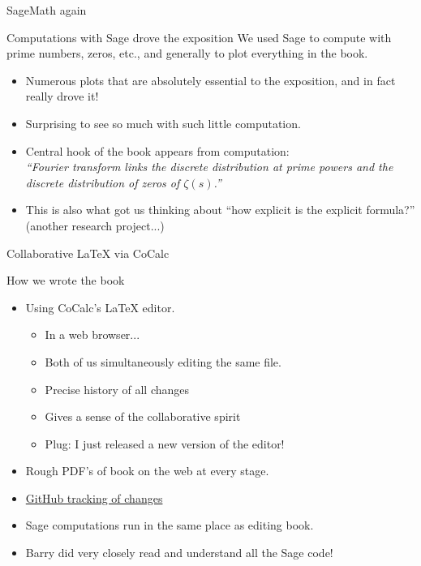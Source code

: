 \documentclass{beamer}
\begin{document}
\begin{frame}{SageMath again}
  \begin{block}{Computations with Sage drove the exposition}
    We used Sage to compute with prime numbers, zeros, etc., and generally to plot everything in the book.
    \begin{itemize}
      \item Numerous plots that are absolutely essential to the exposition, and in fact really drove it!
      \item Surprising to see so much with such little computation.
      \item Central hook of the book appears from computation:\\
            {\em ``Fourier transform links the discrete distribution at prime powers and the discrete distribution of zeros of $\zeta(s)$.''}
      \item This is also what got us thinking about ``how explicit is the explicit formula?'' (another research project...)
    \end{itemize}
  \end{block}
\end{frame}


\begin{frame}{Collaborative \LaTeX{} via CoCalc}
  \begin{block}{How we wrote the book}
    \begin{itemize}
      \item Using CoCalc's \LaTeX{} editor.
            \begin{itemize}
              \item In a web browser...
              \item Both of us simultaneously editing the same file.
              \item Precise history of all changes
              \item Gives a sense of the collaborative spirit
              \item Plug: I just released a new version of the editor!
            \end{itemize}
      \item Rough PDF's of book on the web at every stage.
      \item \href{https://github.com/williamstein/rh}{GitHub tracking of changes}
      \item Sage computations run in the same place as editing book.
      \item Barry did very closely read and understand all the Sage code!
    \end{itemize}
  \end{block}
\end{frame}
\end{document}
